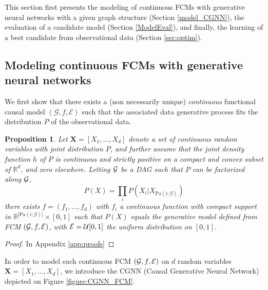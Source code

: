 \documentclass[a4paper, 11pt]{article}
\newtheorem{prop}{Proposition}
\newcommand{\Pa}[1]{\text{Pa}({#1}; \mathcal{G})}
\begin{document}
This section first presents the modeling of continuous FCMs with generative neural networks with a given graph structure (Section \ref{model_CGNN}), the evaluation of a candidate  model (Section \ref{ModelEval}), and finally, the learning of a best candidate from observational data (Section \ref{sec:optim}).


\subsection{Modeling continuous FCMs with generative neural networks \label{model_CGNN}}

We first show that there exists a (non necessarily unique) \textit{continuous} functional causal model $(\mathcal{G}, f, \mathcal{E})$ such that the associated data generative process fits the distribution $P$ of the observational data. 

\begin{prop}{\label{prop1}}
 Let $\textbf{X} = [X_1, \ldots, X_d]$ denote a set of continuous random variables with joint distribution $P$, and further assume that the joint density function $h$ of $P$ is continuous and strictly positive on a compact and convex subset of $\mathbb{R}^{d}$, and zero elsewhere. Letting $\cal G$ be a DAG such that $P$ can be factorized along $\cal G$, 
 $$ P(X) = \prod_i P(X_i | X_{\Pa{i}})$$
 there exists $f = (f_1, \ldots, f_d)$ with $f_i$ a continuous function with compact support in $\mathbb{R}^{|\Pa{i}|}\times [0,1]$ such that $P(X)$ equals the generative model defined from FCM $({\cal G}, f, {\cal E})$, with ${\cal E} = \mathcal{U}[0,1]$ the uniform distribution on $[0,1]$.
\end{prop}
\begin{proof}
In Appendix \ref{app:proofs}
\end{proof}

In order to model such continuous FCM $({\cal G}, f, {\cal E})$ on $d$ random variables $\textbf{X} = [X_1, \ldots, X_d]$, we introduce the CGNN (Causal Generative Neural Network) depicted on Figure \ref{figure:CGNN_FCM}.
\end{document}

